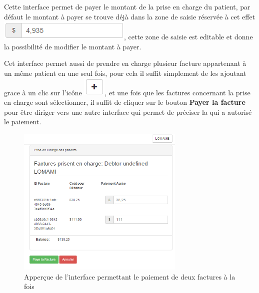 \documentclass[12pt,a4paper]{report}
\begin{document}
Cette interface permet de payer le montant de la prise en charge du patient, par défaut le montant à payer se trouve déjà dans la zone de saisie réservée à cet effet \includegraphics[scale=0.7]{pic/editableDeb.png}, cette zone de saisie est editable et donne la possibilité de modifier le montant à payer. 

Cet interface permet aussi de prendre en charge plusieur facture appartenant à un même patient en une seul fois, pour cela il suffit simplement de les ajoutant grace à un clic sur l'icône \includegraphics[scale=0.7]{pic/plusBlack.png}, et une fois que les factures concernant la prise en charge sont sélectionner, il suffit de cliquer sur le bouton \textbf{Payer la facture} pour être diriger vers une autre interface qui permet de préciser la qui a autorisé le paiement.

\newpage

\begin{figure}[h]
\begin{center}
\includegraphics[width=8cm]{pic/DoubleSupport.png}
\end{center}
\caption{Apperçue de l'interface permettant le paiement de deux factures à la fois}
\label{Apperçue de l'interface permettant le paiement de deux factures à la fois}
\end{figure}
\end{document}
